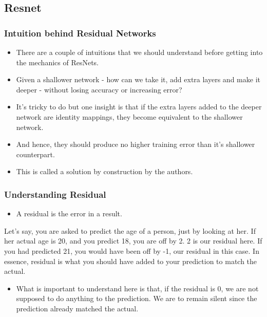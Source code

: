 \documentclass{beamer}
\begin{document}

\subsection{Resnet}
\begin{frame}
\frametitle{Intuition behind Residual Networks}

\begin{itemize}
   
   \item There are a couple of intuitions that we should understand before getting into the mechanics of ResNets. 
   \item Given a shallower network - how can we take it, add extra layers and make it deeper - without losing accuracy or increasing error? 
   \item It’s tricky to do but one insight is that if the extra layers added to the deeper network are identity mappings, they become equivalent to the shallower network.
   \item And hence, they should produce no higher training error than it’s shallower counterpart.
   \item This is called a solution by construction by the authors.
\end{itemize}

\end{frame}


\begin{frame}
\frametitle{Understanding Residual}

\begin{itemize}
   
   \item A residual is the error in a result. 
  
\end{itemize}
\begin{example}[Illustration]
Let’s say, you are asked to predict the age of a person, just by looking at her. If her actual age is 20, and you predict 18, you are off by 2. 2 is our residual here. If you had predicted 21, you would have been off by -1, our residual in this case. In essence, residual is what you should have added to your prediction to match the actual.
\end{example}
\begin{itemize}
    \item What is important to understand here is that, if the residual is 0, we are not supposed to do anything to the prediction. We are to remain silent since the prediction already matched the actual.
\end{itemize}
\end{frame}
\end{document}
